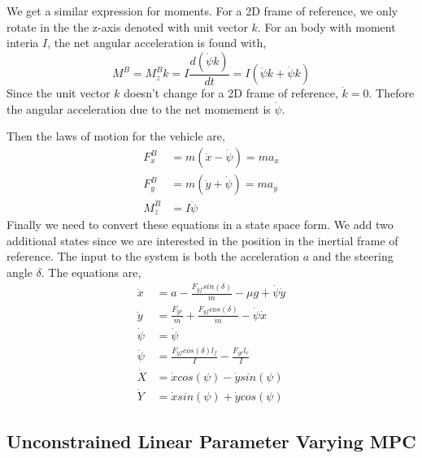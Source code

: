 \documentclass{article}
\begin{document}
\begin{tcolorbox}[title={Newton's laws in a non-inertial frame for reference.}]
We get a similar expression for moments. For a 2D frame of reference, we only rotate in the the z-axis denoted with
unit vector $k$. For an body with moment interia $I$, the net angular acceleration is found with,
\begin{equation}
    M^B = M_z^Bk = I\frac{d(\dot{\psi}k)}{dt} =  I\left(\ddot{\psi}k + \dot{\psi}k\right)
\end{equation}
Since the unit vector $k$ doesn't change for a 2D frame of reference, $\dot{k} = 0$. Thefore the angular acceleration
due to the net momement is $\dot{\psi}$.

\end{tcolorbox}

Then the laws of motion for the vehicle are,
\begin{align}
    F^B_x &= m(\ddot{x} - \dot{\psi}) = ma_x \\
    F^B_y &= m(\ddot{y} + \dot{\psi}) = ma_y \\
    M^B_z &= I\ddot{\psi}
\end{align}
Finally we need to convert these equations in a state space form. We add two additional states since we are interested
in the position in the inertial frame of reference. The input to the system is both the acceleration $a$ and the
steering angle $\delta$. The equations are,
\begin{align}
    \ddot{x} &= a - \frac{F_{yf}sin(\delta)}{m} - \mu g + \dot{\psi}\dot{y} \\
    \ddot{y} &=  \frac{F_{yr}}{m} + \frac{F_{yf}cos(\delta)}{m} - \dot{\psi}\dot{x} \\
    \dot{\psi} &=  \dot{\psi} \\
    \ddot{\psi} &=  \frac{F_{yf}cos(\delta)l_f}{I} - \frac{F_{yr}l_r}{I} \\
    \dot{X} &= \dot{x}cos(\psi) - \dot{y}sin(\psi) \\
    \dot{Y} &= \dot{x}sin(\psi) + \dot{y}cos(\psi)
\end{align}

\subsection{Unconstrained Linear Parameter Varying MPC}
\end{document}

